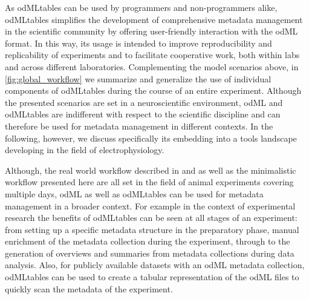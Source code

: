{As odMLtables can be used by programmers and non-programmers alike, odMLtables simplifies the development of comprehensive metadata management in the scientific community by offering user-friendly interaction with the odML format. In this way, its usage is intended to improve reproducibility and replicability of experiments and to facilitate cooperative work, both within labs and across different laboratories. Complementing the model scenarios above, in \cref{fig:global_workflow} we summarize and generalize the use of individual components of odMLtables during the course of an entire experiment. Although the presented scenarios are set in a neuroscientific environment, odML and odMLtables are indifferent with respect to the scientific discipline and can therefore be used for metadata management in different contexts. In the following, however, we discuss specifically its embedding into a tools landscape developing in the field of electrophysiology.

Although, the real world workflow described in \cite{Brochier_2018} and \cite{Zehl_2016} as well as the minimalistic workflow presented here are all set in the field of animal experiments covering multiple days, odML as well as odMLtables can be used for metadata management in a broader context. For example in the context of experimental research the benefits of odMLtables can be seen at all stages of an experiment: from setting up a specific metadata structure in the preparatory phase, manual enrichment of the metadata collection during the experiment, through to the generation of overviews and summaries from metadata collections during data analysis. Also, for publicly available datasets with an odML metadata collection, odMLtables can be used to create a tabular representation of the odML files to quickly scan the metadata of the experiment.

}
